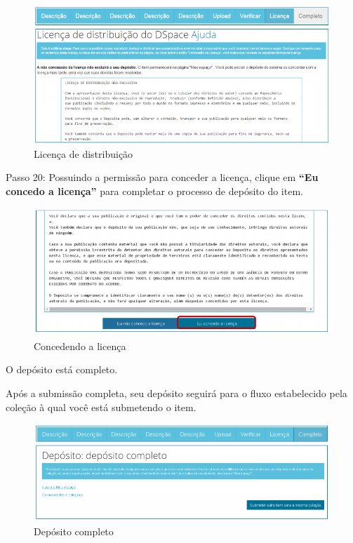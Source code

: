 \documentclass[12pt,hidelinks]{article}
\begin{document}
\newpage

    \begin{figure}[!htp]
                \centering
                \includegraphics[scale=0.8]{figura/Figura160.png}
                \caption{Licença de distribuição}
            \label{Rotulo}
        \end{figure}
    
    Passo 20: Possuindo a permissão para conceder a licença, clique em \textbf{“Eu concedo a licença”} para completar o processo de depósito do item.

    \begin{figure}[!htp]
                \centering
                \includegraphics[scale=0.8]{figura/Figura161.png}
                \caption{Concedendo a licença}
            \label{Rotulo}
        \end{figure}
    
    O depósito está completo.
    
    \singlespacing
    
    Após a submissão completa, seu depósito seguirá para o fluxo estabelecido pela coleção à qual você está submetendo o item.
    
\newpage
    
    \begin{figure}[!htp]
                \centering
                \includegraphics[scale=0.8]{figura/Figura162.png}
                \caption{Depósito completo}
            \label{Rotulo}
        \end{figure}
    
\end{document}
